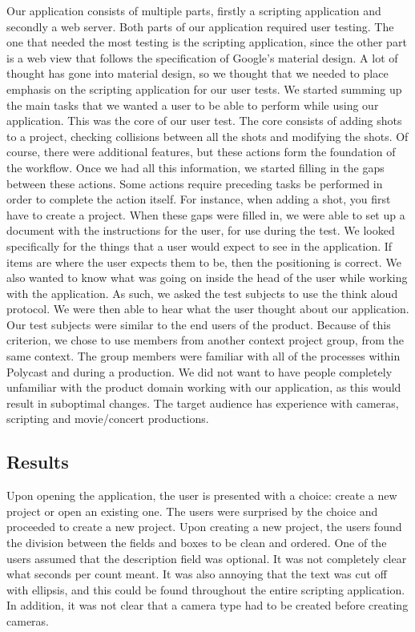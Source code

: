 Our application consists of multiple parts, firstly a scripting application and secondly a web server. Both parts of our application required user testing. The one that needed the most testing is the scripting application, since the other part is a web view that follows the specification of Google's material design. A lot of thought has gone into material design, so we thought that we needed to place emphasis on the scripting application for our user tests. We started summing up the main tasks that we wanted a user to be able to perform while using our application. This was the core of our user test. The core consists of adding shots to a project, checking collisions between all the shots and modifying the shots. Of course, there were additional features, but these actions form the foundation of the workflow. Once we had all this information, we started filling in the gaps between these actions. Some actions require preceding tasks be performed in order to complete the action itself. For instance, when adding a shot, you first have to create a project. When these gaps were filled in, we were able to set up a document with the instructions for the user, for use during the test. We looked specifically for the things that a user would expect to see in the application. If items are where the user expects them to be, then the positioning is correct. We also wanted to know what was going on inside the head of the user while working with the application. As such, we asked the test subjects to use the think aloud protocol. We were then able to hear what the user thought about our application.\\

Our test subjects were similar to the end users of the product. Because of this criterion, we chose to use members from another context project group, from the same context. The group members were familiar with all of the processes within Polycast and during a production. We did not want to have people completely unfamiliar with the product domain working with our application, as this would result in suboptimal changes. The target audience has experience with cameras, scripting and movie/concert productions.
\subsection{Results}
Upon opening the application, the user is presented with a choice: create a new project or open an existing one. The users were surprised by the choice and proceeded to create a new project. Upon creating a new project, the users found the division between the fields and boxes to be clean and ordered. One of the users assumed that the description field was optional. It was not completely clear what seconds per count meant. It was also annoying that the text was cut off with ellipsis, and this could be found throughout the entire scripting application. In addition, it was not clear that a camera type had to be created before creating cameras.\\

